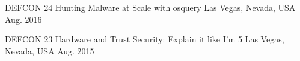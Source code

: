 \begin{cvhonors}

\cvhonor
{DEFCON 24} %
{Hunting Malware at Scale with osquery} %
{Las Vegas, Nevada, USA} %
{Aug. 2016} %


\cvhonor
{DEFCON 23} %
{Hardware and Trust Security: Explain it like I’m 5} %
{Las Vegas, Nevada, USA} %
{Aug. 2015} %


\end{cvhonors}
